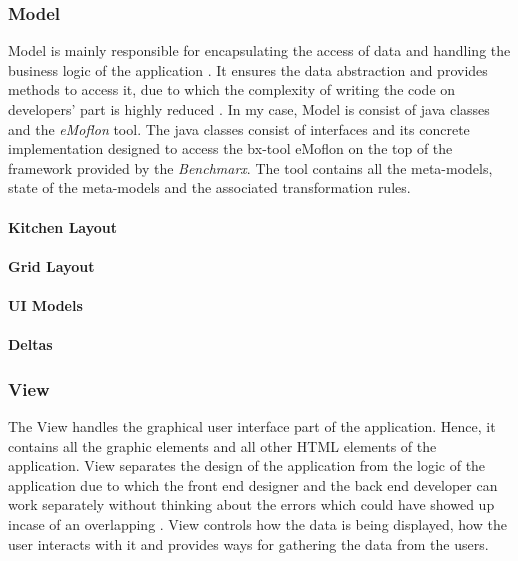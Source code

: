 \subsubsection{Model}\label{subsubsec:model}
Model is mainly responsible for encapsulating the access of data and handling the business logic of the application \cite{designpattern-headfirst} \cite{mvc-arch}. It ensures the data abstraction and provides methods to access it, due to which the complexity of writing the code on developers' part is highly reduced \cite{mdd-webwithmvc}.
\newline\newline In my case, Model is consist of java classes and the \textit{eMoflon} tool. The java classes consist of interfaces and its concrete implementation designed to access the bx-tool eMoflon on the top of the framework provided by the \textit{Benchmarx}. The tool contains all the meta-models, state of the meta-models and the associated transformation rules.
\paragraph{Kitchen Layout}
\paragraph{Grid Layout}
\paragraph{UI Models}
\paragraph{Deltas}

\subsubsection{View}\label{subsubsec:view}
The View handles the graphical user interface part of the application. Hence, it contains all the graphic elements and all other HTML elements of the application. View separates the design of the application from the logic of the application due to which the front end designer and the back end developer can work separately without thinking about the errors which could have showed up incase of an overlapping \cite{designpattern-headfirst} \cite{mvc-arch}. View controls how the data is being displayed, how the user interacts with it and provides ways for gathering the data from the users. 

